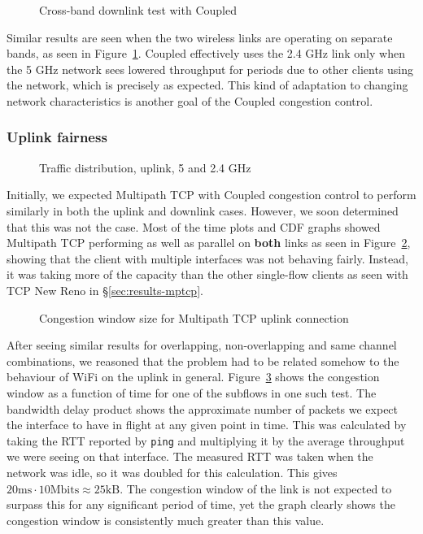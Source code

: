 \begin{figure}[h]
 \centering
 
 \caption{Cross-band downlink test with Coupled}\label{graph:cb-fairness-down}
\end{figure}

Similar results are seen when the two wireless links are operating on separate
bands, as seen in Figure~\ref{graph:cb-fairness-down}. Coupled effectively uses
the 2.4 GHz link only when the 5 GHz network sees lowered throughput for periods
due to other clients using the network, which is precisely as expected. This
kind of adaptation to changing network characteristics is another goal of the
Coupled congestion control.

\subsubsection{Uplink fairness}

\begin{figure}[h]
 \centering
 
 \caption{Traffic distribution, uplink, 5 and 2.4 GHz}\label{graph:up-fair}
\end{figure}

Initially, we expected Multipath TCP with Coupled congestion control to perform
similarly in both the uplink and downlink cases. However, we soon determined
that this was not the case. Most of the time plots and CDF graphs showed 
Multipath TCP performing as well as parallel on \textbf{both} links as seen in
Figure~\ref{graph:up-fair}, showing that the client with multiple interfaces was
not behaving fairly. Instead, it was taking more of the  capacity than the other
single-flow clients as seen with TCP New Reno in \S\ref{sec:results-mptcp}.

\begin{figure}[h]
 \centering
 
 \caption{Congestion window size for Multipath TCP uplink connection}\label{graph:fairness-up-close}
\end{figure}

After seeing similar results for overlapping, non-overlapping and same channel 
combinations, we reasoned that the problem had to be related somehow to the 
behaviour of WiFi on the uplink in general. Figure~\ref{graph:fairness-up-close} 
shows the congestion window as a function of time for one of the subflows in one 
such test. The bandwidth delay product shows the approximate number of packets
we expect the interface to have in flight at any given point in time. This was
calculated by taking the RTT reported by \texttt{ping} and multiplying it by the
average throughput we were seeing on that interface. The measured RTT was taken
when the network was idle, so it was doubled for this calculation. This gives
$20\text{ms} \cdot 10\text{Mbits} \approx 25\text{kB}$. The congestion window of
the link is not expected to surpass this for any significant period of time, yet
the graph clearly shows the congestion window is consistently much greater than
this value.

